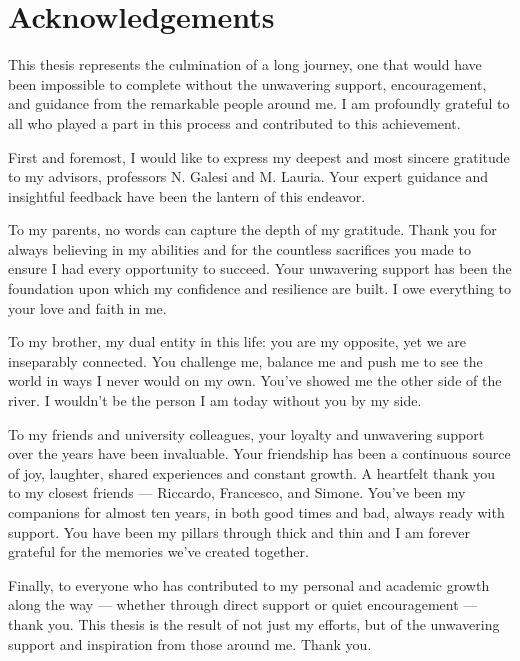 \chapter*{Acknowledgements}

This thesis represents the culmination of a long journey, one that would have been impossible to complete without the unwavering support, encouragement, and guidance from the remarkable people around me. I am profoundly grateful to all who played a part in this process and contributed to this achievement.

First and foremost, I would like to express my deepest and most sincere gratitude to my advisors, professors N. Galesi and M. Lauria. Your expert guidance and insightful feedback have been the lantern of this endeavor.

To my parents, no words can capture the depth of my gratitude. Thank you for always believing in my abilities and for the countless sacrifices you made to ensure I had every opportunity to succeed. Your unwavering support has been the foundation upon which my confidence and resilience are built. I owe everything to your love and faith in me.

To my brother, my dual entity in this life: you are my opposite, yet we are inseparably connected. You challenge me, balance me and push me to see the world in ways I never would on my own. You've showed me the other side of the river. I wouldn't be the person I am today without you by my side.

To my friends and university colleagues, your loyalty and unwavering support over the years have been invaluable. Your friendship has been a continuous source of joy, laughter, shared experiences and constant growth. A heartfelt thank you to my closest friends --- Riccardo, Francesco, and Simone. You've been my companions for almost ten years, in both good times and bad, always ready with support. You have been my pillars through thick and thin and I am forever grateful for the memories we've created together.

Finally, to everyone who has contributed to my personal and academic growth along the way --- whether through direct support or quiet encouragement --- thank you. This thesis is the result of not just my efforts, but of the unwavering support and inspiration from those around me. Thank you.